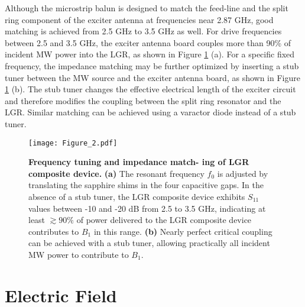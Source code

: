 Although the microstrip balun is designed to match the feed-line and the split ring component of the exciter antenna at frequencies near 2.87 GHz, good matching is achieved from 2.5 GHz to 3.5 GHz as well. For drive frequencies between 2.5 and 3.5 GHz, the
exciter antenna board couples more than 90\% of incident MW power into the LGR, as shown in Figure \ref{LGR_tuning} (a). For a specific fixed frequency, the impedance matching may be further optimized by inserting a stub tuner between the MW source and the exciter antenna board, as shown in Figure \ref{LGR_tuning} (b). The stub tuner changes the effective electrical length of the exciter circuit and therefore modifies the coupling between the split ring resonator and the LGR. Similar matching can be achieved using a varactor diode instead of a stub tuner. 


\begin{figure}[t!]
\centering
\texttt{[image: Figure\_2.pdf]}  
\caption{\textbf{Frequency tuning and impedance match-
ing of LGR composite device.} \textbf{(a)} The resonant frequency $f_0$ is adjusted by translating the sapphire shims in the four capacitive gaps. In the absence of a stub tuner, the LGR composite device exhibits $S_{11}$ values between -10 and -20 dB from 2.5 to 3.5 GHz, indicating at least $\gtrsim90\%$ of power delivered to the LGR composite device contributes to $B_1$ in this range. \textbf{(b)} Nearly perfect critical coupling can be achieved with
a stub tuner, allowing practically all incident MW power to contribute to $B_1$.}
\label{LGR_tuning}
\end{figure}

\pagebreak









\section{Electric Field}

